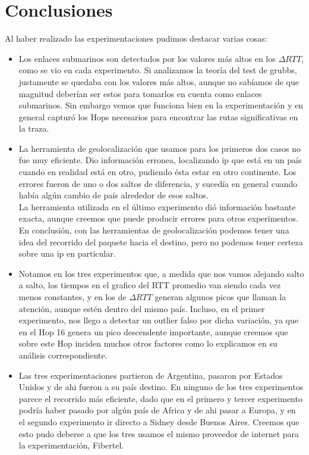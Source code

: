\section{Conclusiones}
Al haber realizado las experimentaciones pudimos destacar varias cosas:
\begin{itemize}
\item Los enlaces submarinos son detectados por los valores más altos en los $\Delta RTT$, como se vio en cada experimento. Si analizamos la teoría del test de grubbs, justamente se quedaba con los valores más altos, aunque no sabíamos de que magnitud deberían ser estos para tomarlos en cuenta como enlaces submarinos. Sin embargo vemos que funciona bien en la experimentación y en general capturó los Hops necesarios para encontrar las rutas significativas en la traza.
\item La herramienta de geolocalización que usamos para los primeros dos casos no fue muy eficiente. Dio información erronea, localizando ip que está en un país cuando en realidad está en otro, pudiendo ésta estar en otro continente. Los errores fueron de uno o dos saltos de diferencia, y sucedía en general cuando había algún cambio de país alrededor de esos saltos.\\
La herramienta utilizada en el último experimento dió información bastante exacta, aunque creemos que puede producir errores para otros experimentos.\\
En conclusión, con las herramientas de geolocalización podemos tener una idea del recorrido del paquete hacia el destino, pero no podemos tener certeza sobre una ip en particular.
\item Notamos en los tres experimentos que, a medida que nos vamos alejando salto a salto, los tiempos en el grafico del RTT promedio van siendo cada vez menos constantes, y en los de $\Delta RTT$ generan algunos picos que llaman la atención, aunque estén dentro del mismo país. Incluso, en el primer experimento, nos llego a detectar un outlier falso por dicha variación, ya que en el Hop 16 genera un pico descendente importante, aunque creemos que sobre este Hop inciden muchos otros factores como lo explicamos en su análisis correspondiente.
\item Las tres experimentaciones partieron de Argentina, pasaron por Estados Unidos y de ahi fueron a su país destino. En ninguno de los tres experimentos parece el recorrido más eficiente, dado que en el primero y tercer experimento podría haber pasado por algún país de Africa y de ahi pasar a Europa, y en el segundo experimento ir directo a Sidney desde Buenos Aires. Creemos que esto pudo deberse a que los tres usamos el mismo proveedor de internet para la experimentación, Fibertel.

\end{itemize}
